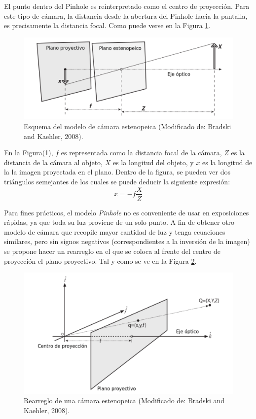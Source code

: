 El punto dentro del Pinhole es reinterpretado como el centro de proyección. Para este tipo de cámara, la distancia desde la abertura del Pinhole hacia la pantalla, es precisamente la distancia focal. Como puede verse en la Figura \ref{fig:pinholeScheme}.\\
	
\begin{figure}
	\centering		
	\includegraphics[scale=0.8]{images/pinholeScheme.pdf}
	\caption{Esquema del modelo de cámara estenopeica (Modificado de: Bradski and Kaehler, 2008).}		
	\label{fig:pinholeScheme}
\end{figure}

En la Figura(\ref{fig:pinholeScheme}), $f$ es representada como la distancia focal de la cámara, $Z$ es la distancia de la cámara al objeto, $X$ es la longitud del objeto, y $x$ es la longitud de la la imagen proyectada en el plano. Dentro de la figura, se pueden ver dos triángulos semejantes de los cuales se puede deducir la siguiente expresión:
\[x = -f \frac{X}{Z}\]
	
Para fines prácticos, el modelo \textit{Pinhole} no es conveniente de usar en exposiciones rápidas, ya que toda su luz proviene de un solo punto. A fin de obtener otro modelo de cámara que recopile mayor cantidad de luz y tenga ecuaciones similares, pero sin signos negativos (correspondientes a la inversión de la imagen) se propone hacer un rearreglo en el que se coloca al frente del centro de proyección el plano proyectivo. Tal y como se ve en la Figura \ref{fig:rearrange_pinhole_scheme}.
	
\begin{figure}
	\centering
	\includegraphics[scale=0.8]{images/rearrange_pinhole_scheme.pdf}
    \caption{Rearreglo de una cámara estenopeica (Modificado de: Bradski and Kaehler, 2008).}
    \label{fig:rearrange_pinhole_scheme}
\end{figure} 

